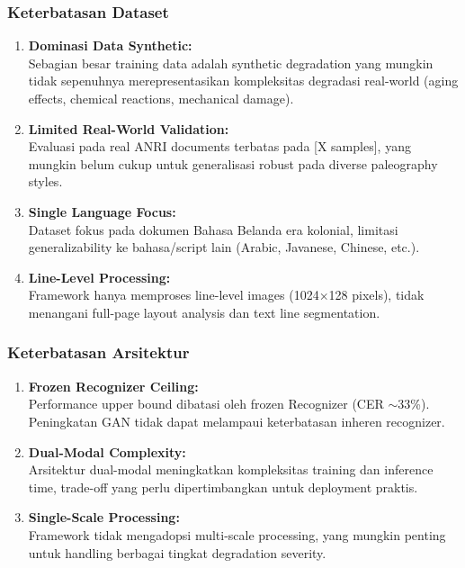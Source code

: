 \documentclass[12pt,a4paper]{article}
\begin{document}
\subsubsection{Keterbatasan Dataset}

\begin{enumerate}[label=\arabic*., leftmargin=0.5cm]
    \item \textbf{Dominasi Data Synthetic:} \\
    Sebagian besar training data adalah synthetic degradation yang mungkin tidak sepenuhnya merepresentasikan kompleksitas degradasi real-world (aging effects, chemical reactions, mechanical damage).
    
    \item \textbf{Limited Real-World Validation:} \\
    Evaluasi pada real ANRI documents terbatas pada [X samples], yang mungkin belum cukup untuk generalisasi robust pada diverse paleography styles.
    
    \item \textbf{Single Language Focus:} \\
    Dataset fokus pada dokumen Bahasa Belanda era kolonial, limitasi generalizability ke bahasa/script lain (Arabic, Javanese, Chinese, etc.).
    
    \item \textbf{Line-Level Processing:} \\
    Framework hanya memproses line-level images (1024×128 pixels), tidak menangani full-page layout analysis dan text line segmentation.
\end{enumerate}

\subsubsection{Keterbatasan Arsitektur}

\begin{enumerate}[label=\arabic*., leftmargin=0.5cm]
    \item \textbf{Frozen Recognizer Ceiling:} \\
    Performance upper bound dibatasi oleh frozen Recognizer (CER $\sim$33\%). Peningkatan GAN tidak dapat melampaui keterbatasan inheren recognizer.
    
    \item \textbf{Dual-Modal Complexity:} \\
    Arsitektur dual-modal meningkatkan kompleksitas training dan inference time, trade-off yang perlu dipertimbangkan untuk deployment praktis.
    
    \item \textbf{Single-Scale Processing:} \\
    Framework tidak mengadopsi multi-scale processing, yang mungkin penting untuk handling berbagai tingkat degradation severity.
\end{enumerate}
\end{document}

